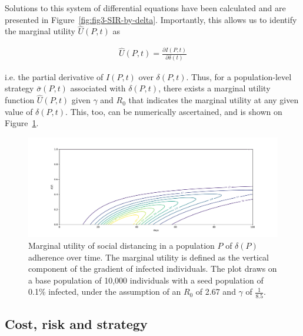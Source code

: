 \documentclass[12pt]{article}
\begin{document}
Solutions to this system of differential equations have been calculated and are presented in Figure~\ref{fig:fig3-SIR-by-delta}. Importantly, this allows us to identify the marginal utility $\hat{U}(P, t)$ as

\begin{equation}
	\begin{aligned}
		\hat{U}(P, t) = \frac{\partial I(P, t)}{\partial \delta(t)}
	\end{aligned}
	\label{eq:marginal_utility}
\end{equation}

\noindent i.e. the partial derivative of $I(P, t)$ over $\delta(P, t)$. Thus, for a population-level strategy $\bar{\sigma}(P, t)$ associated with $\delta(P, t)$, there exists a marginal utility function $\hat{U}(P, t)$ given $\gamma$ and $R_0$ that indicates the marginal utility at any given value of $\delta(P, t)$. This, too, can be numerically ascertained, and is shown on Figure~\ref{fig:marginal_utility}.

\begin{figure}
	\includegraphics[width=\linewidth]{figures/marginal_utility}
	\caption{Marginal utility of social distancing in a population $P$ of $\delta(P)$ adherence over time. The marginal utility is defined as the vertical component of the gradient of infected individuals. The plot draws on a base population of 10,000 individuals with a seed population of 0.1\% infected, under the assumption of an $R_0$ of 2.67 and $\gamma$ of $\frac{1}{8.5}$.}
	\label{fig:marginal_utility}
\end{figure}


\subsection{Cost, risk and strategy} %
\label{sub:cost_risk_and_strategy}
\end{document}
